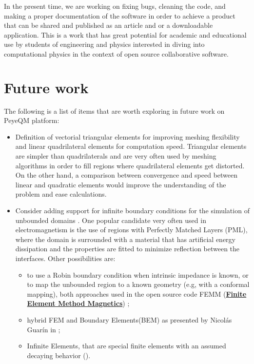 In the present time, we are working on fixing bugs, cleaning the code, and making a proper documentation of the software in order to achieve a product that can be shared and published as an article and or a downloadable application. This is a work that has great potential for academic and educational use by students of engineering and physics interested in diving into computational physics in the context of open source collaborative software.  
 

\section{Future work}
The following is a list of items that are worth exploring in future work on PeyeQM platform:
\begin{itemize}
%
\item Definition of vectorial triangular elements for improving meshing flexibility and linear quadrilateral elements for computation speed. Triangular elements are simpler than quadrilaterals and are very often used by meshing algorithms in order to fill regions where quadrilateral elements get distorted. On the other hand, a comparison between convergence and speed between linear and quadratic elements would improve the understanding of the problem and ease calculations.
%
\item Consider adding support for infinite boundary conditions for the simulation of unbounded domains \cite{antoine2009review, appelo2003}. One popular candidate very often used in electromagnetism is the use of regions with Perfectly Matched Layers (PML)\cite{Jin2010}, where the domain is surrounded with a material that has artificial energy dissipation and the properties are fitted to minimize reflection between the interfaces. Other possibilities are:
\begin{itemize}
\item to use a Robin boundary condition when intrinsic impedance is known, or to map the unbounded region to a known geometry (e.g, with a conformal mapping), both approaches used in the open source code FEMM (\href{http://www.femm.info/wiki/HomePage}{\textbf{Finite Element Method Magnetics}}) \cite{meeker2010_FEMM};
\item hybrid FEM and Boundary Elements(BEM) as presented by Nicol\'as Guar\'in in \cite{Guarin2012};
\item Infinite Elements, that are special finite elements with an assumed decaying behavior (\cite{Zienkiewicz2005}).
\end{itemize} 

\end{itemize}
